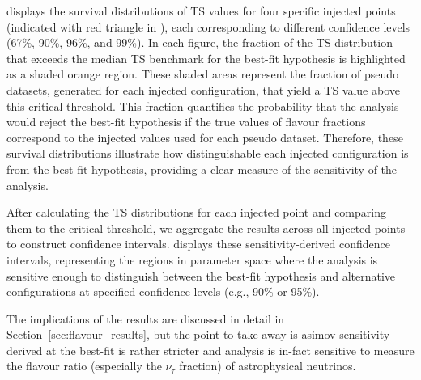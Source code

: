  displays the survival distributions of TS values for four specific injected points (indicated with red triangle in ), each corresponding to different confidence levels (67\%, 90\%, 96\%, and 99\%). In each figure, the fraction of the TS distribution that exceeds the median TS benchmark for the best-fit hypothesis is highlighted as a shaded orange region. These shaded areas represent the fraction of pseudo datasets, generated for each injected configuration, that yield a TS value above this critical threshold. This fraction quantifies the probability that the analysis would reject the best-fit hypothesis if the true values of flavour fractions correspond to the injected values used for each pseudo dataset. Therefore, these survival distributions illustrate how distinguishable each injected configuration is from the best-fit hypothesis, providing a clear measure of the sensitivity of the analysis.

After calculating the TS distributions for each injected point and comparing them to the critical threshold, we aggregate the results across all injected points to construct confidence intervals.  displays these sensitivity-derived confidence intervals, representing the regions in parameter space where the analysis is sensitive enough to distinguish between the best-fit hypothesis and alternative configurations at specified confidence levels (e.g., 90\% or 95\%). 

The implications of the results are discussed in detail in Section~\ref{sec:flavour_results}, but the point to take away is asimov sensitivity derived at the best-fit is rather stricter and analysis is in-fact sensitive to measure the flavour ratio (especially the $\nu_{\tau}$ fraction) of astrophysical neutrinos. 






